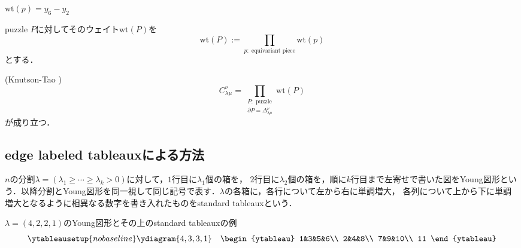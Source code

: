 \begin{center}

  $\text{wt}(p)=y_6-y_2$
\end{center}

\begin{defin}
  puzzle $P$に対してそのウェイト$\text{wt}(P)$を
  \[
  \text{wt}(P):=\prod_{p:\text{ equivariant piece}}\text{wt}(p)
  \]
  とする．
\end{defin}

\begin{theo}(Knutson-Tao \cite{knutson tao})
  \[
  C^\nu_{\lambda\mu}=\prod_{\substack{P:\text{ puzzle} \\ \partial P = \Delta^\nu_{\lambda\mu}}}\text{wt}(P)
  \]
  が成り立つ．
\end{theo}



\subsection{edge labeled tableauxによる方法}

\begin{defin}
  $n$の分割$\lambda=(\lambda_1\geq\cdots\geq\lambda_k>0)$に対して，$1$行目に$\lambda_1$個の箱を， $2$行目に$\lambda_2$個の箱を，順に$k$行目まで左寄せで書いた図をYoung図形という．以降分割とYoung図形を同一視して同じ記号で表す．$\lambda$の各箱に，各行について左から右に単調増大， 各列について上から下に単調増大となるように相異なる数字を書き入れたものをstandard tableauxという．
\end{defin}

\begin{eg}
$\lambda=(4,2,2,1)$のYoung図形とその上のstandard tableauxの例
\[
\ytableausetup{nobaseline}
\ydiagram{4, 3, 3, 1}
\quad\begin{ytableau}
    1&3&5&6\\
    2&4&8\\
    7&9&10\\
    11
\end{ytableau}
\]
\end{eg}


